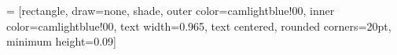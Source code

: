 %
%
%                 

\newcommand{\myfig}[3][0]{
\begin{center}
  \vspace{1.5cm}
  \texttt{[image: \#2]}
  \nobreak\medskip
\end{center}}

%
%
%

\setcounter{figure}{1}
\newcommand{\mycaption}[1]{
  \vspace{0.5cm}
  \begin{quote}
    {{\sc Figure} \arabic{figure}: #1}
  \end{quote}
  \vspace{1cm}
  \stepcounter{figure}
}

%
%


%
%

\setlength{\columnsep}{0.03\textwidth}
\setlength{\columnseprule}{0.0018\textwidth}
\setlength{\parindent}{0.0cm}

%
% 
%

 = [rectangle, 
			draw=none, 
			shade, 
			outer color=camlightblue!00,
			inner color=camlightblue!00,
			text width=0.965\columnwidth,
			text centered,
			rounded corners=20pt,
			minimum height=0.09\columnwidth]

